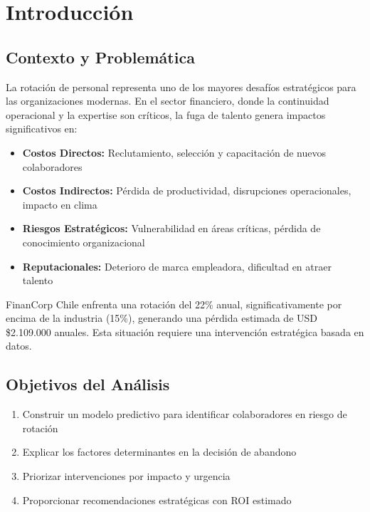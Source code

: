 \documentclass[11pt,a4paper,twoside]{article}
\begin{document}
\section{Introducción}

\subsection{Contexto y Problemática}

La rotación de personal representa uno de los mayores desafíos estratégicos para las organizaciones modernas. En el sector financiero, donde la continuidad operacional y la expertise son críticos, la fuga de talento genera impactos significativos en:

\begin{itemize}
    \item \textbf{Costos Directos:} Reclutamiento, selección y capacitación de nuevos colaboradores
    \item \textbf{Costos Indirectos:} Pérdida de productividad, disrupciones operacionales, impacto en clima
    \item \textbf{Riesgos Estratégicos:} Vulnerabilidad en áreas críticas, pérdida de conocimiento organizacional
    \item \textbf{Reputacionales:} Deterioro de marca empleadora, dificultad en atraer talento
\end{itemize}

FinanCorp Chile enfrenta una rotación del 22\% anual, significativamente por encima de la industria (15\%), generando una pérdida estimada de USD \$2.109.000 anuales. Esta situación requiere una intervención estratégica basada en datos.

\subsection{Objetivos del Análisis}

\begin{enumerate}
    \item Construir un modelo predictivo para identificar colaboradores en riesgo de rotación
    \item Explicar los factores determinantes en la decisión de abandono
    \item Priorizar intervenciones por impacto y urgencia
    \item Proporcionar recomendaciones estratégicas con ROI estimado
\end{enumerate}
\end{document}
